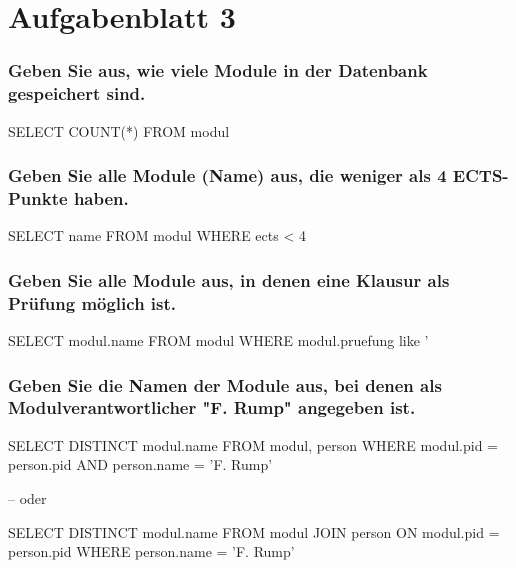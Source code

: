 
\section{Aufgabenblatt 3}

\subsubsection{Geben Sie aus, wie viele Module in der Datenbank gespeichert sind.}
    \begin{sql}
        SELECT COUNT(*)
            FROM modul      
    \end{sql}

    \subsubsection{Geben Sie alle Module (Name) aus, die weniger als 4 ECTS-Punkte haben.}
    \begin{sql}
        SELECT name
            FROM modul
            WHERE ects < 4
    \end{sql}

    \subsubsection{Geben Sie alle Module aus, in denen eine Klausur als Prüfung möglich ist.}
    \begin{sql}
        SELECT modul.name
            FROM modul
            WHERE modul.pruefung like '%
    \end{sql}

    \subsubsection{Geben Sie die Namen der Module aus, bei denen als Modulverantwortlicher "F. Rump" angegeben ist.}
    \begin{sql}
        SELECT DISTINCT modul.name
            FROM modul, person
            WHERE modul.pid = person.pid AND person.name = 'F. Rump'

                -- oder

        SELECT DISTINCT modul.name
            FROM modul
            JOIN person ON modul.pid = person.pid
            WHERE person.name = 'F. Rump'
    \end{sql}

